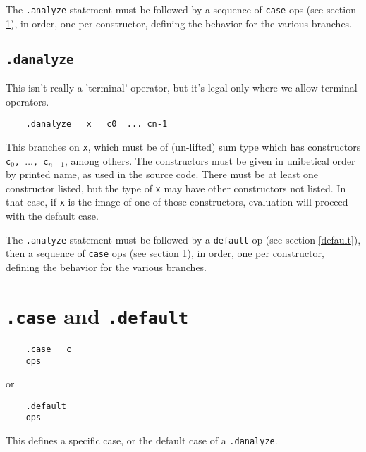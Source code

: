 \documentclass{report}
\newcommand\stringcode[1]{\texttt{#1}}
\begin{document}
The \stringcode{.analyze} statement must be followed by a sequence of \stringcode{case} ops (see section \ref{case}),
in order, one per constructor, defining the behavior for the various branches.

\subsection{\stringcode{.danalyze}}

This isn't really a 'terminal' operator, but it's legal only where we allow terminal operators.

\begin{verbatim}
	.danalyze	x	c0	...	cn-1
\end{verbatim}

This branches on \stringcode{x}, which must be of (un-lifted) sum type which has constructors \stringcode{c$_0$, $\ldots$, c$_{n-1}$},
among others.
The constructors must be given in unibetical order by printed name, as used in the source code.
There must be at least one constructor listed, but the type of \stringcode{x} may have other constructors not listed.
In that case, if \stringcode{x} is the image of one of those constructors, evaluation will proceed with the default case.

The \stringcode{.analyze} statement must be followed by a \stringcode{default} op (see section \ref{default}),
then a sequence of \stringcode{case} ops (see section \ref{case}),
in order, one per constructor, defining the behavior for the various branches.

\section{\stringcode{.case} and \stringcode{.default}}
\label{case}

\begin{verbatim}
	.case	c
	ops
\end{verbatim}
or
\begin{verbatim}
	.default
	ops
\end{verbatim}

This defines a specific case, or the default case of a \stringcode{.danalyze}.
\end{document}

